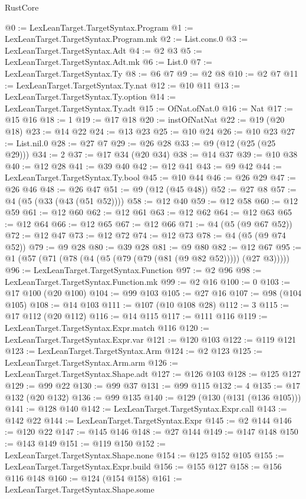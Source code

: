 \begin{lexlean}{RustCore}
\begin{coremodule}
@0 := LexLeanTarget.TargetSyntax.Program
@1 := LexLeanTarget.TargetSyntax.Program.mk
@2 := List.cons.{0}
@3 := LexLeanTarget.TargetSyntax.Adt
@4 := @2 @3
@5 := LexLeanTarget.TargetSyntax.Adt.mk
@6 := List.{0}
@7 := LexLeanTarget.TargetSyntax.Ty
@8 := @6 @7
@9 := @2 @8
@10 := @2 @7
@11 := LexLeanTarget.TargetSyntax.Ty.nat
@12 := @10 @11
@13 := LexLeanTarget.TargetSyntax.Ty.option
@14 := LexLeanTarget.TargetSyntax.Ty.adt
@15 := OfNat.ofNat.{0}
@16 := Nat
@17 := @15 @16
@18 := 1
@19 := @17 @18
@20 := instOfNatNat
@22 := @19 (@20 @18)
@23 := @14 @22
@24 := @13 @23
@25 := @10 @24
@26 := @10 @23
@27 := List.nil.{0}
@28 := @27 @7
@29 := @26 @28
@33 := @9 (@12 (@25 (@25 @29)))
@34 := 2
@37 := @17 @34 (@20 @34)
@38 := @14 @37
@39 := @10 @38
@40 := @12 @28
@41 := @39 @40
@42 := @12 @41
@43 := @9 @42
@44 := LexLeanTarget.TargetSyntax.Ty.bool
@45 := @10 @44
@46 := @26 @29
@47 := @26 @46
@48 := @26 @47
@51 := @9 (@12 (@45 @48))
@52 := @27 @8
@57 := @4 (@5 (@33 (@43 (@51 @52))))
@58 := @12 @40
@59 := @12 @58
@60 := @12 @59
@61 := @12 @60
@62 := @12 @61
@63 := @12 @62
@64 := @12 @63
@65 := @12 @64
@66 := @12 @65
@67 := @12 @66
@71 := @4 (@5 (@9 @67 @52))
@72 := @12 @47
@73 := @12 @72
@74 := @12 @73
@78 := @4 (@5 (@9 @74 @52))
@79 := @9 @28
@80 := @39 @28
@81 := @9 @80
@82 := @12 @67
@95 := @1 (@57 (@71 (@78 (@4 (@5 (@79 (@79 (@81 (@9 @82 @52))))) (@27 @3)))))
@96 := LexLeanTarget.TargetSyntax.Function
@97 := @2 @96
@98 := LexLeanTarget.TargetSyntax.Function.mk
@99 := @2 @16
@100 := 0
@103 := @17 @100 (@20 @100)
@104 := @99 @103
@105 := @27 @16
@107 := @98 (@104 @105)
@108 := @14 @103
@111 := @107 (@10 @108 @28)
@112 := 3
@115 := @17 @112 (@20 @112)
@116 := @14 @115
@117 := @111 @116
@119 := LexLeanTarget.TargetSyntax.Expr.match @116
@120 := LexLeanTarget.TargetSyntax.Expr.var
@121 := @120 @103
@122 := @119 @121
@123 := LexLeanTarget.TargetSyntax.Arm
@124 := @2 @123
@125 := LexLeanTarget.TargetSyntax.Arm.arm
@126 := LexLeanTarget.TargetSyntax.Shape.adt
@127 := @126 @103
@128 := @125 @127
@129 := @99 @22
@130 := @99 @37
@131 := @99 @115
@132 := 4
@135 := @17 @132 (@20 @132)
@136 := @99 @135
@140 := @129 (@130 (@131 (@136 @105)))
@141 := @128 @140
@142 := LexLeanTarget.TargetSyntax.Expr.call
@143 := @142 @22
@144 := LexLeanTarget.TargetSyntax.Expr
@145 := @2 @144
@146 := @120 @22
@147 := @145 @146
@148 := @27 @144
@149 := @147 @148
@150 := @143 @149
@151 := @119 @150
@152 := LexLeanTarget.TargetSyntax.Shape.none
@154 := @125 @152 @105
@155 := LexLeanTarget.TargetSyntax.Expr.build
@156 := @155 @127
@158 := @156 @116 @148
@160 := @124 (@154 @158)
@161 := LexLeanTarget.TargetSyntax.Shape.some

\end{coremodule}
\end{lexlean}
